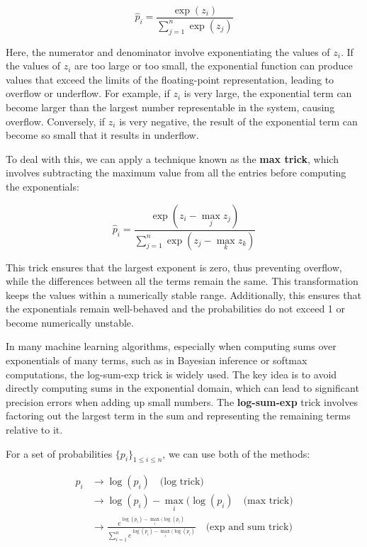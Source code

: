 \documentclass[12pt, a4paper]{article}
\theoremstyle{definition}
\numberwithin{figure}{section}
\numberwithin{equation}{section}
\numberwithin{table}{section}
\begin{document}
\begin{equation}
\hat{p}_i = \frac{\exp(z_i)}{\sum_{j=1}^{n} \exp(z_j)}
\end{equation}

Here, the numerator and denominator involve exponentiating the values of $z_i$. If the values of $z_i$ are too large or too small, the exponential function can produce values that exceed the limits of the floating-point representation, leading to overflow or underflow. For example, if $z_i$ is very large, the exponential term can become larger than the largest number representable in the system, causing overflow. Conversely, if $z_i$ is very negative, the result of the exponential term can become so small that it results in underflow.

To deal with this, we can apply a technique known as the \textbf{max trick}, which involves subtracting the maximum value from all the entries before computing the exponentials:

\begin{equation}
\hat{p}_i = \frac{\exp(z_i - \max_j z_j)}{\sum_{j=1}^{n} \exp(z_j - \max_k z_k)}
\end{equation}

This trick ensures that the largest exponent is zero, thus preventing overflow, while the differences between all the terms remain the same. This transformation keeps the values within a numerically stable range. Additionally, this ensures that the exponentials remain well-behaved and the probabilities do not exceed 1 or become numerically unstable.

In many machine learning algorithms, especially when computing sums over exponentials of many terms, such as in Bayesian inference or softmax computations, the log-sum-exp trick is widely used. The key idea is to avoid directly computing sums in the exponential domain, which can lead to significant precision errors when adding up small numbers. The \textbf{log-sum-exp} trick involves factoring out the largest term in the sum and representing the remaining terms relative to it.

For a set of probabilities $\{p_i\}_{1 \leq i \leq n}$, we can use both of the methods:

\begin{align}
p_i &\rightarrow \log(p_i) \quad \text{(log trick)} \\
&\rightarrow \log(p_i) - \max_i(\log(p_i) \quad \text{(max trick)} \\
&\rightarrow \frac{e^{\log(p_i) - \max_i(\log(p_i)}}{\sum_{i=1}^n e^{\log(p_i) - \max_i(\log(p_i)}} \quad \text{(exp and sum trick)}
\end{align}
\end{document}
